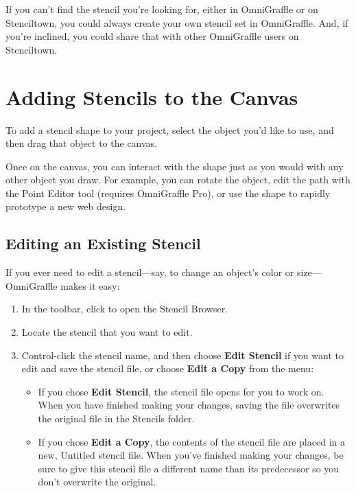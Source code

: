 \documentclass[../main.tex]{subfiles}
\begin{document}
If you can't find the stencil you're looking for, either in OmniGraffle or on Stenciltown, you
could always create your own stencil set in OmniGraffle. And, if you're inclined, you could
share that with other OmniGraffle users on Stenciltown.

\section{Adding Stencils to the Canvas}

To add a stencil shape to your project, select the object you'd like to use, and then drag that
object to the canvas.


Once on the canvas, you can interact with the shape just as you would with any other object you
draw. For example, you can rotate the object, edit the path with the Point Editor tool
(requires OmniGraffle Pro), or use the shape to rapidly prototype a new web design.

\subsection{Editing an Existing Stencil}

If you ever need to edit a stencil---say, to change an object's color or size---OmniGraffle
makes it easy:

\begin{enumerate}
  \item In the toolbar, click  to open the
    Stencil Browser.
  \item Locate the stencil that you want to edit.
  \item Control-click the stencil name, and then choose \textbf{Edit Stencil} if you want to
    edit and save the stencil file, or choose \textbf{Edit a Copy} from the menu:


    \begin{itemize}
      \item If you chose \textbf{Edit Stencil}, the stencil file opens for you to work on. When
        you have finished making your changes, saving the file overwrites the original file in the
        Stencils folder.
      \item If you chose \textbf{Edit a Copy}, the contents of the stencil file are placed in a
        new, Untitled stencil file. When you've finished making your changes, be sure to give this
        stencil file a different name than its predecessor so you don't overwrite the original.
    \end{itemize}
\end{enumerate}
\end{document}
